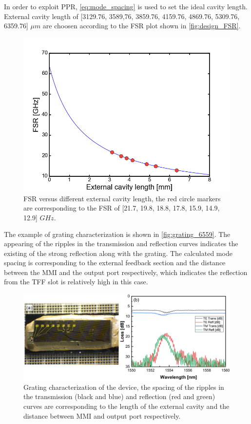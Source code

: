 In order to exploit PPR, \autoref{eq:mode_spacing} is used to set the ideal cavity length. External cavity length of [3129.76, 3589,76, 3859.76, 4159.76, 4869.76, 5309.76, 6359.76] $\mu m$ are choosen according to the FSR plot shown in \autoref{fig:design_FSR}.

\begin{figure}[ht]
    \centering
    \includegraphics[width=.7\linewidth]{figures/design_FSR.png}
    \caption{FSR versus different external cavity length, the red circle markers are corresponding to the FSR of [21.7, 19.8, 18.8, 17.8, 15.9, 14.9, 12.9] $GHz$.}
    \label{fig:design_FSR}
\end{figure}

The example of grating characterization is shown in \autoref{fig:grating_6559}. The appearing of the ripples in the transmission and reflection curves indicates the existing of the strong reflection along with the grating. The calculated mode spacing is corresponding to the external feedback section and the distance between the MMI and the output port respectively, which indicates the reflection from the TFF slot is relatively high in this case.

\begin{figure}[H]
    \centering
    \includegraphics[width=\linewidth]{figures/grating_6559.png}
    \caption{Grating characterization of the device, the spacing of the ripples in the transmission (black and blue) and reflection (red and green) curves are corresponding to the length of the external cavity and the distance between MMI and output port respectively.}
    \label{fig:grating_6559}
\end{figure}

